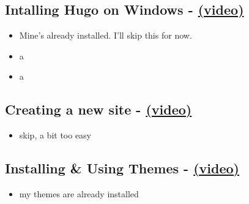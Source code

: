 \subsection{Intalling Hugo on Windows - \href{https://youtu.be/G7umPCU-8xc?list=PLLAZ4kZ9dFpOnyRlyS-liKL5ReHDcj4G3}{(video)} }
\begin{itemize}
	\item
	Mine's already installed. I'll skip this for now.
	\item
	a
	\item
	a
\end{itemize}

\subsection{Creating a new site - \href{https://youtu.be/sB0HLHjgQ7E?list=PLLAZ4kZ9dFpOnyRlyS-liKL5ReHDcj4G3}{(video)} }
\begin{itemize}
	\item skip, a bit too easy

\end{itemize}

\subsection{Installing \& Using Themes - \href{https://youtu.be/L34JL_3Jkyc?list=PLLAZ4kZ9dFpOnyRlyS-liKL5ReHDcj4G3}{(video)} }
\begin{itemize}
	\item my themes are already installed
\end{itemize}

